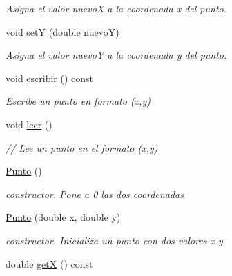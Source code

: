 \begin{DoxyCompactItemize}
\begin{DoxyCompactList}\small\item\em Asigna el valor nuevoX a la coordenada x del punto. \end{DoxyCompactList}\item 
void \hyperlink{classPunto_a6a0f8adb5946f31a7867a06f54d97462}{setY} (double nuevoY)\hypertarget{classPunto_a6a0f8adb5946f31a7867a06f54d97462}{}\label{classPunto_a6a0f8adb5946f31a7867a06f54d97462}

\begin{DoxyCompactList}\small\item\em Asigna el valor nuevoY a la coordenada y del punto. \end{DoxyCompactList}\item 
void \hyperlink{classPunto_afc543b48134f632fa354d8b027954e80}{escribir} () const \hypertarget{classPunto_afc543b48134f632fa354d8b027954e80}{}\label{classPunto_afc543b48134f632fa354d8b027954e80}

\begin{DoxyCompactList}\small\item\em Escribe un punto en formato (x,y) \end{DoxyCompactList}\item 
void \hyperlink{classPunto_a84cc9b0ee2e5b00842e7bff819b80459}{leer} ()\hypertarget{classPunto_a84cc9b0ee2e5b00842e7bff819b80459}{}\label{classPunto_a84cc9b0ee2e5b00842e7bff819b80459}

\begin{DoxyCompactList}\small\item\em // Lee un punto en el formato (x,y) \end{DoxyCompactList}\item 
\hyperlink{classPunto_a4b8b70b933ff13493ee5ddb3c8532c10}{Punto} ()\hypertarget{classPunto_a4b8b70b933ff13493ee5ddb3c8532c10}{}\label{classPunto_a4b8b70b933ff13493ee5ddb3c8532c10}

\begin{DoxyCompactList}\small\item\em constructor. Pone a 0 las dos coordenadas \end{DoxyCompactList}\item 
\hyperlink{classPunto_a911bb8d88eaa1f9904a27b0e159a51c0}{Punto} (double x, double y)\hypertarget{classPunto_a911bb8d88eaa1f9904a27b0e159a51c0}{}\label{classPunto_a911bb8d88eaa1f9904a27b0e159a51c0}

\begin{DoxyCompactList}\small\item\em constructor. Inicializa un punto con dos valores x y \end{DoxyCompactList}\item 
double \hyperlink{classPunto_aa218292fec9bad5ec6d71d4bd9173d9d}{getX} () const \hypertarget{classPunto_aa218292fec9bad5ec6d71d4bd9173d9d}{}\label{classPunto_aa218292fec9bad5ec6d71d4bd9173d9d}


\end{DoxyCompactItemize}
